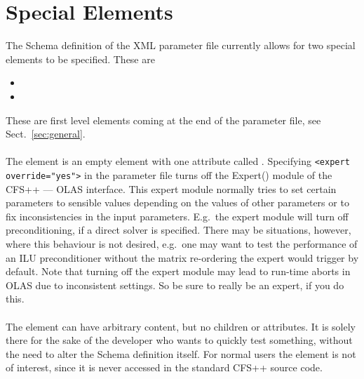 \chapter{Special Elements}
\label{chap:SpecialElements}
%
%
The Schema definition of the XML parameter file currently allows for two
special elements to be specified. These are
%
%
\begin{itemize}
\item {}
\item {}
\end{itemize}
%
%
These are first level elements coming at the end of the parameter file, see
Sect.~\ref{sec:general}.
%
%
\subsubsection*{}
%
%
The  element is an empty element with one attribute called
. Specifying \verb+<expert override="yes">+ in the parameter file
turns off the Expert() module of the CFS++ --- OLAS interface. This expert
module normally tries to set certain
parameters to sensible values depending on the values of other parameters or
to fix inconsistencies in the input parameters. E.g.~the expert module will
turn off preconditioning, if a direct solver is specified. There may be situations, however, where this behaviour is not
desired, e.g.~one may want to test the performance of an ILU preconditioner
without the  matrix re-ordering the expert would trigger by default.
Note that turning off the expert module may lead to run-time aborts in OLAS due
to inconsistent settings. So be sure to really be an expert, if you do this.
%
%
\subsubsection*{}
%
%
The  element can have arbitrary content, but no children or
attributes. It is solely there for the sake of the developer who wants to
quickly test something, without the need to alter the Schema definition itself.
For normal users the element is not of interest, since it is never accessed
in the standard CFS++ source code.

